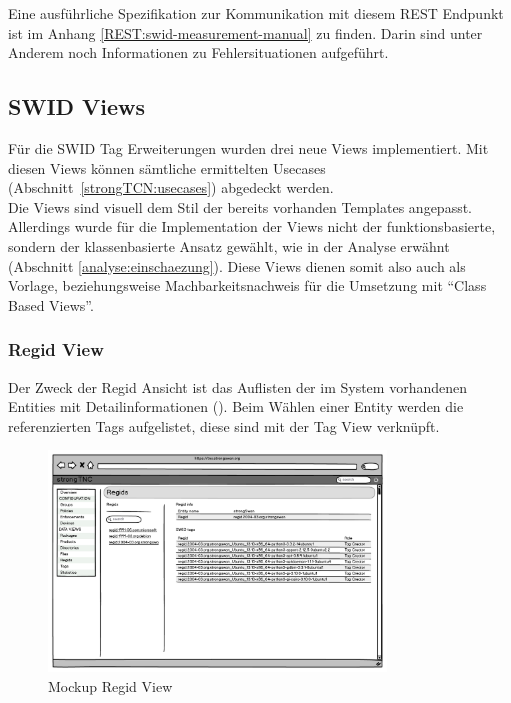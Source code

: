 Eine ausführliche Spezifikation zur Kommunikation mit diesem REST Endpunkt ist
im Anhang \autoref{REST:swid-measurement-manual} zu finden. Darin sind unter
Anderem noch Informationen zu Fehlersituationen aufgeführt.


\subsection{SWID Views}
Für die SWID Tag Erweiterungen wurden drei neue Views implementiert. Mit diesen
Views können sämtliche ermittelten Usecases (Abschnitt~\ref{strongTCN:usecases})
abgedeckt werden.\\
Die Views sind visuell dem Stil der bereits vorhanden Templates angepasst.
Allerdings wurde für die Implementation der Views nicht der funktionsbasierte,
sondern der klassenbasierte Ansatz gewählt, wie in der Analyse erwähnt
(Abschnitt \ref{analyse:einschaezung}). Diese Views dienen somit also auch als
Vorlage, beziehungsweise Machbarkeitsnachweis für die Umsetzung mit
\enquote{Class Based Views}.


\subsubsection{Regid View}
Der Zweck der Regid Ansicht ist das Auflisten der im System vorhandenen Entities
mit Detailinformationen (). Beim Wählen einer Entity
werden die referenzierten Tags aufgelistet, diese sind mit der Tag View
verknüpft.

\begin{figure}[H]
	\centering
	\includegraphics[width=0.8\textwidth]{./images/mockups/swid-regid-view}
	\caption{Mockup Regid View}
	\label{fig:regid-view-mockup}
\end{figure}

